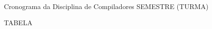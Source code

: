 \documentclass[11pt,portuguese,a4paper]{article}
\begin{document}
\begin{center}
  {\LARGE Cronograma da Disciplina de Compiladores SEMESTRE (TURMA)}
\end{center}

TABELA
\end{document}

